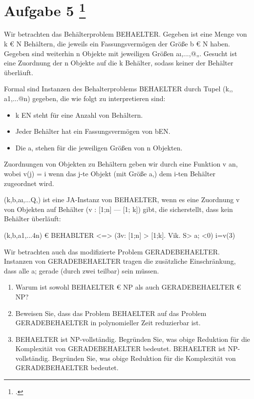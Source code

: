 \documentclass{lehramt-informatik-aufgabe}
\begin{document}
\section{Aufgabe 5
\footcite{examen:66115:2019:03}}

Wir betrachten das Behälterproblem BEHAELTER. Gegeben ist eine Menge von
k € N Behältern, die jeweils ein Fassungsvermögen der Größe b € N haben.
Gegeben sind weiterhin n Objekte mit jeweiligen Größen aı,...,@„.
Gesucht ist eine Zuordnung der n Objekte auf die k Behälter, sodass
keiner der Behälter überläuft.

Formal sind Instanzen des Behalterproblems BEHAELTER durch Tupel (k,,
a1,...@n) gegeben, die wie folgt zu interpretieren sind:

\begin{itemize}
\item k EN steht für eine Anzahl von Behältern.

\item Jeder Behälter hat ein Fassungsvermögen von bEN.

\item  Die a, stehen für die jeweiligen Größen von n Objekten.
\end{itemize}

Zuordnungen von Objekten zu Behältern geben wir durch eine Funktion v
an, wobei v(j) = i wenn das j-te Objekt (mit Größe a,) dem i-ten
Behälter zugeordnet wird.

(k,b,aı,...Q,) ist eine JA-Instanz von BEHAELTER, wenn es eine Zuordnung
v von Objekten auf Behälter (v : [1;n] — [1; k]) gibt, die sicherstellt,
dass kein Behälter überläuft:

(k,b,a1,...4n) € BEHABLTER <=> (3v: [1;n] > [1;k]. Vik. S> a; <0)
i=v(3)

Wir betrachten auch das modifizierte Problem GERADEBEHAELTER. Instanzen
von GERADEBEHAELTER tragen die zusätzliche Einschränkung, dass alle a;
gerade (durch zwei teilbar) sein müssen.

\begin{enumerate}


\item Warum ist sowohl BEHAELTER € NP als auch GERADEBEHAELTER € NP?


\item Beweisen Sie, dass das Problem BEHAELTER auf das Problem
GERADEBEHAELTER in polynomieller Zeit reduzierbar ist.


\item BEHAELTER ist NP-vollständig. Begründen Sie, was obige Reduktion
für die Komplexität von GERADEBEHAELTER bedeutet. BEHAELTER ist
NP-vollständig. Begründen Sie, was obige Reduktion für die Komplexität
von GERADEBEHAELTER bedeutet.

\end{enumerate}
\end{document}
